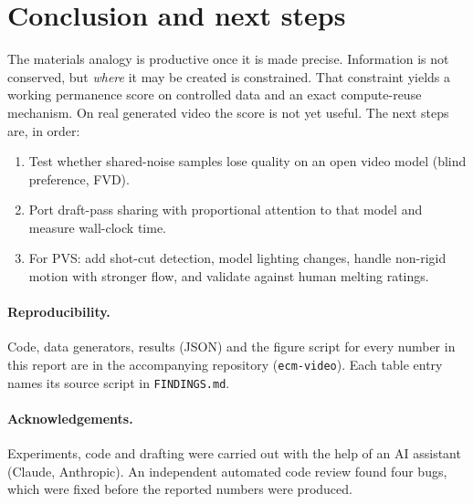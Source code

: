 \documentclass[10pt,twocolumn,letterpaper]{article}
\begin{document}
\section{Conclusion and next steps}
The materials analogy is productive once it is made precise. Information is not conserved, but \emph{where} it may be created is constrained. That constraint yields a working permanence score on controlled data and an exact compute-reuse mechanism. On real generated video the score is not yet useful. The next steps are, in order:
\begin{enumerate}
\item Test whether shared-noise samples lose quality on an open video model (blind preference, FVD).
\item Port draft-pass sharing with proportional attention to that model and measure wall-clock time.
\item For PVS: add shot-cut detection, model lighting changes, handle non-rigid motion with stronger flow, and validate against human melting ratings.
\end{enumerate}

\paragraph{Reproducibility.} Code, data generators, results (JSON) and the figure script for every number in this report are in the accompanying repository (\texttt{ecm-video}). Each table entry names its source script in \texttt{FINDINGS.md}.

\paragraph{Acknowledgements.} Experiments, code and drafting were carried out with the help of an AI assistant (Claude, Anthropic). An independent automated code review found four bugs, which were fixed before the reported numbers were produced.
\end{document}
